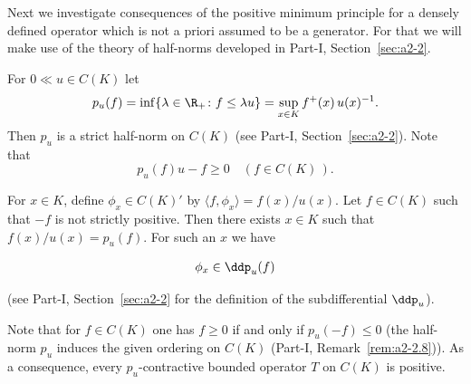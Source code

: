 Next we investigate consequences of the positive minimum principle for a densely defined operator which is not a priori assumed to be a generator.
For that we will make use of the theory of half-norms developed in Part-I, Section~\ref{sec:a2-2}.

For $0  \ll u \in C(K)$ let
\begin{equation}\label{eq:b2-1.4}
p_{u}(f) = \inf\{\lambda \in \R_{+} \colon f \leq \lambda u\} = \sup_{x \in K} f^{+}(x)\,u(x)^{-1}.
\end{equation}
Then $p_{u}$ is a strict half-norm on $C(K)$ 
(see Part-I, Section~\ref{sec:a2-2}).
Note that
\begin{equation}\label{eq:b2-1.5}
p_{u}(f)u - f \geq 0 \quad (f \in C(K)\,).
\end{equation}

For $x \in K$, define $\phi_{x} \in C(K)'$ by $\langle f,\phi_{x} \rangle = f(x)/u(x)$.
Let $f \in C(K)$ such that $-f$ is not strictly positive.
Then there exists $x \in K$ such that $f(x)/u(x) = p_{u}(f)$.
For such an $x$ we have

\begin{equation}\label{eq:b2-1.6}
\phi_{x} \in \ddp_{u}(f)
\end{equation}


(see Part-I, Section~\ref{sec:a2-2} for the definition of the subdifferential $\ddp_{u}$).

Note that for $f \in C(K)$ one has $f \geq 0$ if and only if\/ $p_{u}(-f) \leq 0$ (\ie  the half-norm $p_{u}$ induces the given ordering on $C(K)$ (\cf Part-I, Remark~\ref{rem:a2-2.8})).
As a consequence, every $p_{u}$-contractive bounded operator $T$ on $C(K)$ is positive.

